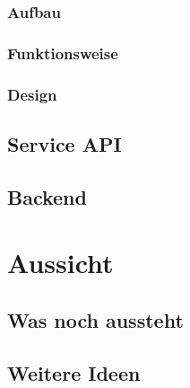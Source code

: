 \documentclass[aspectratio=169]{beamer}
\begin{document}
				\subsubsection{Aufbau}
								
				\subsubsection{Funktionsweise}
									
				\subsubsection{Design}
						
		\subsection{Service API}
				
				
		\subsection{Backend}
			
\section{Aussicht}
		\subsection{Was noch aussteht}
		\subsection{Weitere Ideen}


\end{document}
